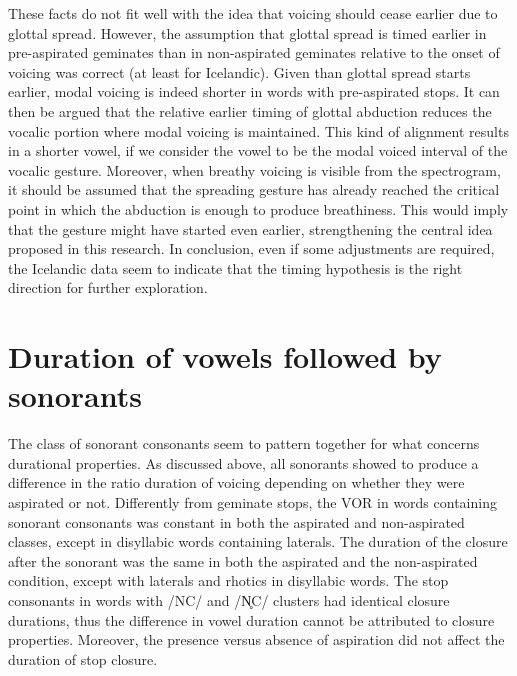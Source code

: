 \documentclass[11pt,a4paper,oneside,openany]{memoir}\usepackage[]{graphicx}\usepackage[]{color}
\begin{document}

These facts do not fit well with the idea that voicing should cease earlier due to glottal spread.
However, the assumption that glottal spread is timed earlier in pre-aspirated geminates than in non-aspirated geminates relative to the onset of voicing was correct (at least for Icelandic).
Given than glottal spread starts earlier, modal voicing is indeed shorter in words with pre-aspirated stops.
It can then be argued that the relative earlier timing of glottal abduction reduces the vocalic portion where modal voicing is maintained.
This kind of alignment results in a shorter vowel, if we consider the vowel to be the modal voiced interval of the vocalic gesture.
Moreover, when breathy voicing is visible from the spectrogram, it should be assumed that the spreading gesture has already reached the critical point in which the abduction is enough to produce breathiness.
This would imply that the gesture might have started even earlier, strengthening the central idea proposed in this research.
In conclusion, even if some adjustments are required, the Icelandic data seem to indicate that the timing hypothesis is the right direction for further exploration.


\section{Duration of vowels followed by sonorants}

The class of sonorant consonants seem to pattern together for what concerns durational properties.
As discussed above, all sonorants showed to produce a difference in the ratio duration of voicing depending on whether they were aspirated or not.
Differently from geminate stops, the VOR in words containing sonorant consonants was constant in both the aspirated and non-aspirated classes, except in disyllabic words containing laterals.
The duration of the closure after the sonorant was the same in both the aspirated and the non-aspirated condition, except with laterals and rhotics in disyllabic words.
The stop consonants in words with /NC/ and /N̥C/ clusters had identical closure durations, thus the difference in vowel duration cannot be attributed to closure properties.
Moreover, the presence versus absence of aspiration did not affect the duration of stop closure.
\end{document}
